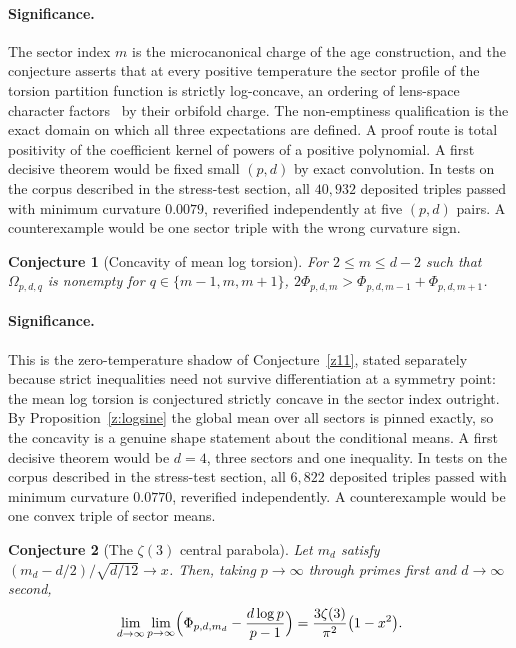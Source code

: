 \documentclass[11pt]{article}
\newtheorem{conjecture}{Conjecture}
\theoremstyle{definition}
\begin{document}
\paragraph{Significance.}
The sector index $m$ is the microcanonical charge of the age construction, and the conjecture asserts that at every positive temperature the sector profile of the torsion partition function is strictly log-concave, an ordering of lens-space character factors~\cite{NO92} by their orbifold charge.  The non-emptiness qualification is the exact domain on which all three expectations are defined.  A proof route is total positivity of the coefficient kernel of powers of a positive polynomial.  A first decisive theorem would be fixed small $(p,d)$ by exact convolution.  In tests on the corpus described in the stress-test section, all $40{,}932$ deposited triples passed with minimum curvature $0.0079$, reverified independently at five $(p,d)$ pairs.  A counterexample would be one sector triple with the wrong curvature sign.

\begin{conjecture}[Concavity of mean log torsion]\label{z12}
For $2\le m\le d-2$ such that $\Omega_{p,d,q}$ is nonempty for $q\in\{m-1,m,m+1\}$, $2\Phi_{p,d,m}>\Phi_{p,d,m-1}+\Phi_{p,d,m+1}$.
\end{conjecture}

\paragraph{Significance.}
This is the zero-temperature shadow of Conjecture~\ref{z11}, stated separately because strict inequalities need not survive differentiation at a symmetry point: the mean log torsion is conjectured strictly concave in the sector index outright.  By Proposition~\ref{z:logsine} the global mean over all sectors is pinned exactly, so the concavity is a genuine shape statement about the conditional means.  A first decisive theorem would be $d=4$, three sectors and one inequality.  In tests on the corpus described in the stress-test section, all $6{,}822$ deposited triples passed with minimum curvature $0.0770$, reverified independently.  A counterexample would be one convex triple of sector means.

\begin{conjecture}[The $\zeta(3)$ central parabola]\label{z13}
Let $m_d$ satisfy $(m_d-d/2)/\sqrt{d/12}\to x$.  Then, taking $p\to\infty$ through primes first and $d\to\infty$ second,
\[
\lim_{d\to\infty}\lim_{p\to\infty}\Bigl(\Phi_{p,d,m_d}-\frac{d\log p}{p-1}\Bigr)=\frac{3\zeta(3)}{\pi^2}\bigl(1-x^2\bigr).
\]
\end{conjecture}
\end{document}
